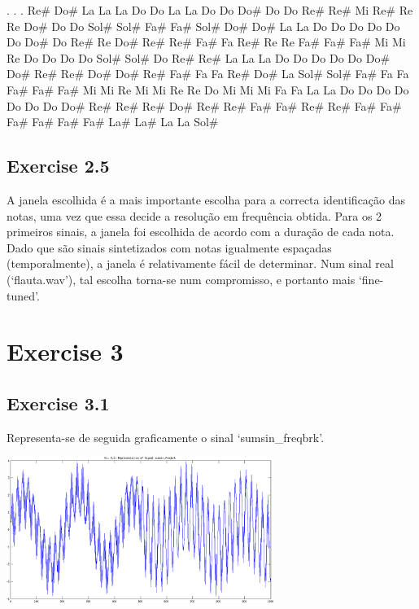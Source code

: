 \documentclass[a4paper]{article}
\begin{document}
. . . Re\# Do\# La La La Do Do La La Do Do Do\# Do Do Re\# Re\# Mi Re\# Re Re Do\# Do Do Sol\# Sol\# Fa\# Fa\# Sol\# Do\# Do\# La La Do Do Do Do Do Do Do\# Do Re\# Re Do\# Re\# Re\# Fa\# Fa Re\# Re Re Fa\# Fa\# Fa\# Mi Mi Re Do Do Do Do Sol\# Sol\# Do Re\# Re\# La La La Do Do Do Do Do Do\# Do\# Re\# Re\# Do\# Do\# Re\# Fa\# Fa Fa Re\# Do\# La Sol\# Sol\# Fa\# Fa Fa Fa\# Fa\# Fa\# Mi Mi Re Mi Mi Re Re Do Mi Mi Mi Fa Fa La La Do Do Do Do Do Do Do Do\# Re\# Re\# Re\# Do\# Re\# Re\# Fa\# Fa\# Re\# Re\# Fa\# Fa\# Fa\# Fa\# Fa\# Fa\# La\# La\# La La Sol\# 

\subsection{Exercise 2.5}
\indent \indent A janela escolhida é a mais importante escolha para a correcta identificação das notas, uma vez que essa decide a resolução em frequência obtida. Para os 2 primeiros sinais, a janela foi escolhida de acordo com a duração de cada nota. Dado que são sinais sintetizados com notas igualmente espaçadas (temporalmente), a janela é relativamente fácil de determinar. Num sinal real (`flauta.wav'), tal escolha torna-se num compromisso, e portanto mais `fine-tuned'.

\section{Exercise 3}
\subsection{Exercise 3.1}
\indent \indent Representa-se de seguida graficamente o sinal `sumsin\_freqbrk'.
\begin{center}
	\includegraphics[width=0.65\textwidth]{images/ex_3_1.png}
\end{center}
\end{document}
